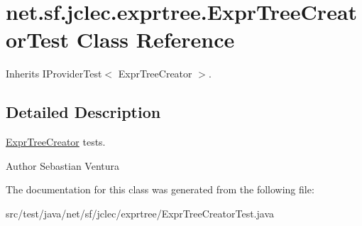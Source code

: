 \hypertarget{classnet_1_1sf_1_1jclec_1_1exprtree_1_1_expr_tree_creator_test}{\section{net.\-sf.\-jclec.\-exprtree.\-Expr\-Tree\-Creator\-Test Class Reference}
\label{classnet_1_1sf_1_1jclec_1_1exprtree_1_1_expr_tree_creator_test}
}


Inherits I\-Provider\-Test$<$ Expr\-Tree\-Creator $>$.



\subsection{Detailed Description}
\hyperlink{classnet_1_1sf_1_1jclec_1_1exprtree_1_1_expr_tree_creator}{Expr\-Tree\-Creator} tests.

\begin{DoxyAuthor}{Author}
Sebastian Ventura 
\end{DoxyAuthor}


The documentation for this class was generated from the following file\-:\begin{DoxyCompactItemize}
\item 
src/test/java/net/sf/jclec/exprtree/Expr\-Tree\-Creator\-Test.\-java\end{DoxyCompactItemize}
